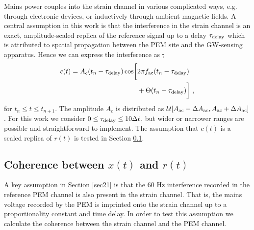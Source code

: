 \documentclass[pra,superscriptaddress,reprint,amsmath,amssymb,nofootinbib]{revtex4-2}
\providecommand{\DIFdeltex}[1]{{\protect\color{red}\sout{#1}}}                      %
\providecommand{\DIFdelbegin}{} %
\providecommand{\DIFdelend}{} %
\providecommand{\DIFdel}[1]{\texorpdfstring{\DIFdeltex{#1}}{}} %
\newcommand{\DIFscaledelfig}{0.5}
\newlength{\DIFdelgraphicswidth} %
\newlength{\DIFdelgraphicsheight} %
\newcommand{\DIFdelincludegraphics}[2][]{%
\sbox{\DIFdelgraphicsbox}{\DIFOincludegraphics[#1]{#2}}%
\settoboxwidth{\DIFdelgraphicswidth}{\DIFdelgraphicsbox} %
\settoboxtotalheight{\DIFdelgraphicsheight}{\DIFdelgraphicsbox} %
\scalebox{\DIFscaledelfig}{%
\parbox[b]{\DIFdelgraphicswidth}{\usebox{\DIFdelgraphicsbox}\\[-\baselineskip] \rule{\DIFdelgraphicswidth}{0em}}\llap{\resizebox{\DIFdelgraphicswidth}{\DIFdelgraphicsheight}{%
\setlength{\unitlength}{\DIFdelgraphicswidth}%
\begin{picture}(1,1)%
\thicklines\linethickness{2pt} %
{\color[rgb]{1,0,0}\put(0,0){\framebox(1,1){}}}%
{\color[rgb]{1,0,0}\put(0,0){\line( 1,1){1}}}%
{\color[rgb]{1,0,0}\put(0,1){\line(1,-1){1}}}%
\end{picture}%
}\hspace*{3pt}}} %
} %
\DeclareRobustCommand{\DIFdelbegin}{\DIFOdelbegin \let\includegraphics\DIFdelincludegraphics} %
\DeclareRobustCommand{\DIFdelend}{\DIFOaddend \let\includegraphics\DIFOincludegraphics} %
\begin{document}
Mains power couples into the strain channel in various complicated ways, e.g. through electronic devices, or inductively through ambient magnetic fields. A central assumption in this work is that the interference in the strain channel is an exact, amplitude-scaled replica of the reference signal up to a delay $\tau_{\rm delay}$ which is attributed to spatial propagation between the PEM site and the GW-sensing apparatus. Hence we can express the interference as 
 \DIFdelbegin \DIFdel{, 
 }\DIFdelend \begin{align}
	c(t) = A_c(t_n - \tau_{\rm delay}) \cos \biggl [ & 2 \pi f_{\rm ac} (t_n - \tau_{\rm delay}) \nonumber \\ 
	&+ \Theta(t_n - \tau_{\rm delay}	) \biggr ] \ ,
	\label{eq:vclutter}
\end{align}
for $t_n \leq t \leq t_{n+1}$. The amplitude $A_c$ is distributed as $\mathcal{U}[A_{\rm ac}- \Delta A_{\rm ac} ,A_{\rm ac} + \Delta A_{\rm ac} ]$. For this work we consider $0 \leq \tau_{\rm delay} \leq 10 \Delta t$, but wider or narrower ranges are possible and straightforward to implement. The assumption that $c(t)$ is a scaled replica of $r(t)$ is tested in Section \ref{sec23}.




\subsection{Coherence between $x(t)$ and $r(t)$}  \label{sec23}
A key assumption in Section \ref{sec21} is that the 60 Hz interference recorded in the reference PEM channel is also present in the strain channel. That is, the mains voltage recorded by the PEM is imprinted onto the strain channel up to a proportionality constant and time delay. In order to test this assumption we calculate the coherence between the strain channel and the PEM channel. \newline 
\end{document}
